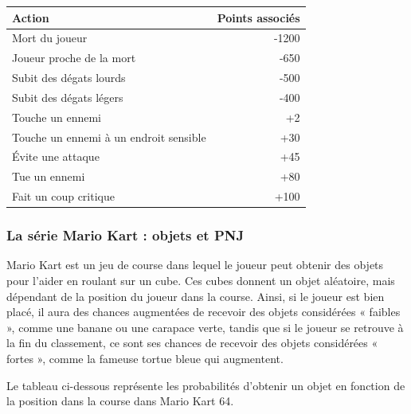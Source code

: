 \documentclass[a4paper, 12pt]{article} %
\begin{document}
\begin{center} 
	\begin{tabular}{|l|r|}
		\hline
		Action 									&Points associés\\
		\hline
		Mort du joueur							&-1200\\
		Joueur proche de la mort				&-650\\
		Subit des dégats lourds					&-500\\
		Subit des dégats légers					&-400\\
		\hline
		Touche un ennemi						&+2\\
		Touche un ennemi à un endroit sensible	&+30\\
		Évite une attaque						&+45\\
		Tue un ennemi							&+80\\
		Fait un coup critique					&+100\\
		\hline
	\end{tabular}
\end{center}

\newpage
\subsubsection{La série Mario Kart : objets et PNJ}

Mario Kart est un jeu de course dans lequel le joueur peut obtenir des objets pour l'aider en roulant sur un cube. Ces cubes donnent un objet aléatoire, mais dépendant de la position du joueur dans la course. Ainsi, si le joueur est bien placé, il aura des chances augmentées de recevoir des objets considérées « faibles », comme une banane ou une carapace verte, tandis que si le joueur se retrouve à la fin du classement, ce sont ses chances de recevoir des objets considérées « fortes », comme la fameuse tortue bleue qui augmentent.

 Le tableau ci-dessous représente les probabilités d'obtenir un objet en fonction de la position dans la course dans Mario Kart 64.
\end{document}
